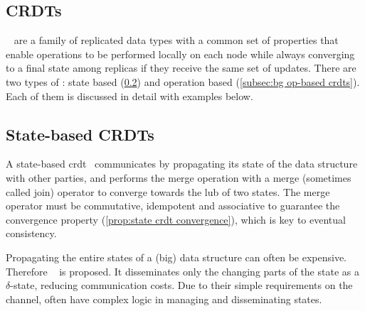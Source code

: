 \subsection{CRDTs} \label{sec:bg crdt}

~\cite{preguica2018CRDT,shapiro2011CRDT} are a family of replicated 
data types with a common set of properties 
that enable operations to be performed locally on each node while always converging
to a final state among replicas if they receive the same set of updates. 
There are two types of : state 
based (\cref{subsec:bg state-based crdt}) and operation 
based (\cref{subsec:bg op-based crdts}). 
Each of them is discussed in detail with examples below.

\subsection{State-based CRDTs}  \label{subsec:bg state-based crdt}


A state-based 
\acrshort{crdt}~\cite{vanderlinde2016delta-CRDTs,almeida2018DeltaCRDT,shapiro2011CRDT,preguica2018CRDT} communicates by propagating its state of 
the data structure with other parties, and performs the merge operation with a merge
(sometimes called join) operator to converge towards the \acrfull{lub} of
two states. The merge operator must be commutative, idempotent and
associative to guarantee the convergence property (\cref{prop:state crdt convergence}),
which is key to eventual consistency.


Propagating the entire states of a (big) data structure can often be expensive.
Therefore ~\cite{almeida2018DeltaCRDT} is proposed. It
disseminates only the changing parts of the state as 
a \(\delta\)-state, reducing communication costs.
Due to their simple requirements on the channel,  often
have complex logic in managing and disseminating states.


